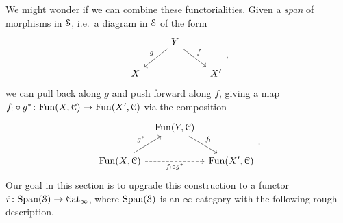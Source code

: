 \documentclass[main.tex]{subfiles}
\begin{document}
We might wonder if we can combine these functorialities. Given a \emph{span} of morphisms in $\S$, i.e.\ a diagram in $\S$ of the form
\begin{equation}
  \label{eq:span_of_spaces}
  \begin{tikzcd}
    & Y
    \arrow[dl, swap, "g"]
    \arrow[dr, "f"]
    \\
    X
    && X'
  \end{tikzcd},
\end{equation}
we can pull back along $g$ and push forward along $f$, giving a map $f_{!} \circ g^{*}\colon \Fun(X, \category{C}) \to \Fun(X', \category{C})$ via the composition
\begin{equation*}
  \begin{tikzcd}[column sep=tiny]
    & \Fun(Y, \category{C})
    \arrow[dr, "f_{!}"]
    \\
    \Fun(X, \category{C})
    \arrow[rr, dashed, swap, "f_{!} \circ g^{*}"]
    \arrow[ur, "g^{*}"]
    && \Fun(X', \category{C})
  \end{tikzcd}.
\end{equation*}
Our goal in this section is to upgrade this construction to a functor $\hat{r}\colon \Span(\S) \to \ICat$, where $\Span(\S)$ is an $\infty$-category with the following rough description.
\end{document}
